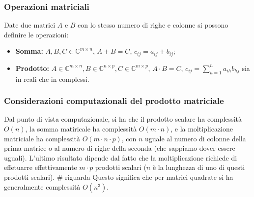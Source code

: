 \documentclass[a4paper,11pt]{article}
\begin{document}
\subsubsection{Operazioni matriciali}
Date due matrici $A$ e $B$ con lo stesso numero di righe e colonne si possono definire le operazioni:
\begin{itemize}
	\item \textbf{Somma:} $A, B, C \in \mathbb{C}^{m \times n}$, $A + B = C$, $c_{ij} = a_{ij} + b_{ij}$;
	\item \textbf{Prodotto:} $A \in \mathbb{C}^{m \times n}, B \in \mathbb{C}^{n \times p}, C \in \mathbb{C}^{m \times p}$, $A \cdot B = C$, $c_{ij} = \sum_{h = 1}^n a_{ih} b_{hj}$ sia in reali che in complessi. 
\end{itemize}

\subsubsection{Considerazioni computazionali del prodotto matriciale}
Dal punto di vista computazionale, si ha che il prodotto scalare ha complessità $O(n)$, la somma matiricale ha complessità $O(m \cdot n)$, e la moltiplicazione matriciale ha complessità $O(m \cdot n \cdot p)$, con $n$ uguale al numero di colonne della prima matrice o al numero di righe della seconda (che sappiamo dover essere uguali).
L'ultimo risultato dipende dal fatto che la moltiplicazione richiede di effetuarre effettivamente $m \cdot p$ prodotti scalari ($n$ è la lunghezza di uno di questi prodotti scalari). # riguarda
Questo significa che per matrici quadrate si ha generalmente complessità $O(n^3)$.
\end{document}
